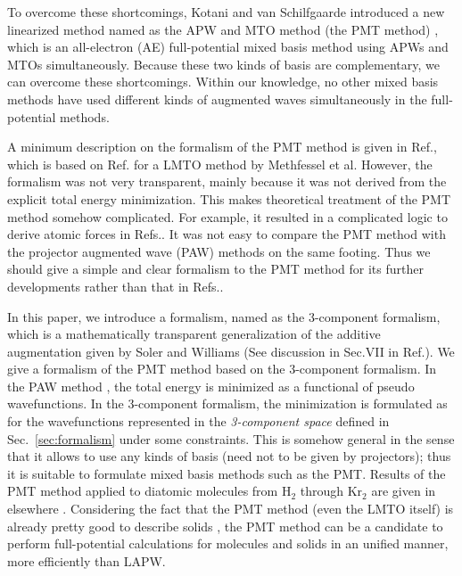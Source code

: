 \documentclass[a4paper,10pt,aip,onecolumn,amsmath,amssymb,floatfix,rmp]{revtex4-1}
\newcommand{\refsec}[1]{\mbox{Sec.~\!\ref{#1}}}
\begin{document}
To overcome these shortcomings, 
Kotani and van Schilfgaarde introduced a new linearized method 
named as the APW and MTO method (the PMT method) \cite{pmt1}, which is an all-electron (AE) 
full-potential mixed basis method using APWs and MTOs simultaneously.
Because these two kinds of basis are complementary, 
we can overcome these shortcomings. Within our knowledge, 
no other mixed basis methods have used different kinds 
of augmented waves simultaneously in the full-potential methods.

A minimum description on the formalism of the PMT method is given in Ref.\cite{pmt1}, 
which is based on Ref.\cite{lmfchap} for a LMTO method  
by Methfessel et al. However, the formalism was not very transparent, 
mainly because it was not derived from the explicit total energy minimization.
This makes theoretical treatment of the PMT method somehow complicated.
For example, it resulted in a complicated logic to derive atomic forces 
in Refs.\cite{molforce,lmfchap}. 
It was not easy to compare the PMT method with the projector augmented
wave (PAW) methods \cite{PAW,kresse99} on the same footing.
Thus we should give a simple and clear formalism to the PMT method 
for its further developments rather than that in Refs.\cite{pmt1,lmfchap}.

In this paper, we introduce a formalism, named as the 3-component
formalism, which is a mathematically transparent generalization of the additive
augmentation given by Soler and Williams \cite{soler89,soler90,soler93} 
(See discussion in Sec.VII in Ref.\cite{PAW}).
We give a formalism of the PMT method based on the 3-component formalism.
In the PAW method \cite{PAW}, the total energy is minimized as a
functional of pseudo wavefunctions. In the 3-component formalism,
the minimization is formulated as for the wavefunctions represented in the 
{\it 3-component space} defined in \refsec{sec:formalism} under some constraints.
This is somehow general in the sense that it allows to use any kinds of basis 
(need not to be given by projectors); thus it is
suitable to formulate mixed basis methods such as the PMT.
Results of the PMT method applied to diatomic molecules from H$_2$ through Kr$_2$ 
are given in elsewhere \cite{kotanimol2011}. Considering the fact
that the PMT method (even the LMTO itself) is already pretty good to
describe solids \cite{pmt1,lmfchap,kotani07a,mark06adeq},
the PMT method can be a candidate to perform full-potential
calculations for molecules and solids in an unified manner, 
more efficiently than LAPW.
\end{document}
